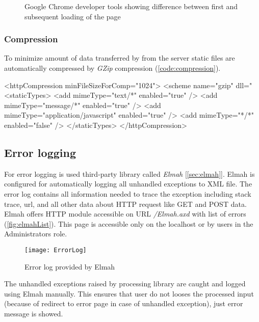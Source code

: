 \begin{figure}[h!]
	\hfill
	\caption{Google Chrome developer tools showing difference between first and subsequent loading of the page}
	\label{fig:cacheDt}
\end{figure}


\subsubsection{Compression}

To minimize amount of data transferred by from the server static files are automatically compressed by \emph{GZip} compression (\autoref{code:compression}).

\begin{XML}[label=code:compression,caption={Compression part of the \emph{Web.config}}]
<httpCompression minFileSizeForComp="1024">
<scheme name="gzip" dll="%
	<staticTypes>
		<add mimeType="text/*" enabled="true" />
		<add mimeType="message/*" enabled="true" />
		<add mimeType="application/javascript" enabled="true" />
		<add mimeType="*/*" enabled="false" />
	</staticTypes>
</httpCompression>
\end{XML}


\subsection{Error logging}

For error logging is used third-party library called \emph{Elmah} [\ref{sec:elmah}].
Elmah is configured for automatically logging all unhandled exceptions to XML file.
The error log contains all information needed to trace the exception including stack trace, url, and all other data about HTTP request like GET and POST data.
Elmah offers HTTP module accessible on URL \emph{/Elmah.axd} with list of errors (\autoref{fig:elmahList}).
This page is accessible only on the localhost or by users in the Administrators role.

\begin{figure}[h!]
	\texttt{[image: ErrorLog]}
	\caption{Error log provided by Elmah}
	\label{fig:elmahList}
\end{figure}

The unhandled exceptions raised by \lsystem processing library are caught and logged using Elmah manually.
This ensures that user do not looses the processed input (because of redirect to error page in case of unhandled exception), just error message is showed.


